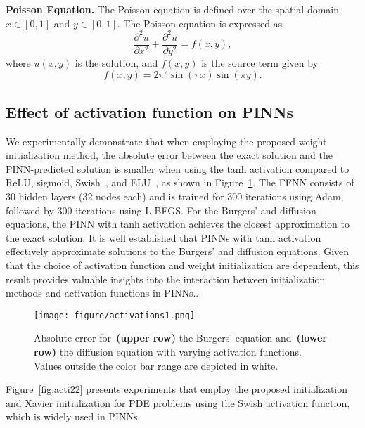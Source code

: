 \documentclass{article} \usepackage{iclr2025_conference,times}
\begin{document}
\textbf{Poisson Equation.} The Poisson equation is defined over the spatial domain \(x \in [0, 1]\) and \(y \in [0, 1]\). The Poisson equation is expressed as
\begin{equation*}\label{eqn-Poisson}
\frac{\partial^2 u}{\partial x^2} + \frac{\partial^2 u}{\partial y^2} = f(x, y),
\end{equation*}
where \(u(x, y)\) is the solution, and \(f(x, y)\) is the source term given by
\[
f(x, y) = 2\pi^2 \sin(\pi x) \sin(\pi y).
\]

\medskip

\subsection{Effect of activation function on PINNs}\label{act}
We experimentally demonstrate that when employing the proposed weight initialization method, the absolute error between the exact solution and the PINN-predicted solution is smaller when using the tanh activation compared to ReLU, sigmoid, Swish~\citep{ramachandran2017searching}, and ELU~\citep{clevert2015fast}, as shown in Figure~\ref{fig:act}. The FFNN consists of 30 hidden layers (32 nodes each) and is trained for 300 iterations using Adam, followed by 300 iterations using L-BFGS. For the Burgers' and diffusion equations, the PINN with tanh activation achieves the closest approximation to the exact solution. It is well established that PINNs with tanh activation effectively approximate solutions to the Burgers' and diffusion equations. Given that the choice of activation function and weight initialization are dependent, this result provides valuable insights into the interaction between initialization methods and activation functions in PINNs.. 
 

\bigskip 

\begin{figure}[h!]
\centering 
\texttt{[image: figure/activations1.png]}
\caption{
Absolute error for~\textbf{(upper row)} the Burgers' equation and~\textbf{(lower row)} the diffusion equation with varying activation functions. Values outside the color bar range are depicted in white.}
\label{fig:act}
\end{figure}
Figure~\ref{fig:acti22} presents experiments that employ the proposed initialization and Xavier initialization for PDE problems using the Swish activation function, which is widely used in PINNs. 
\end{document}
